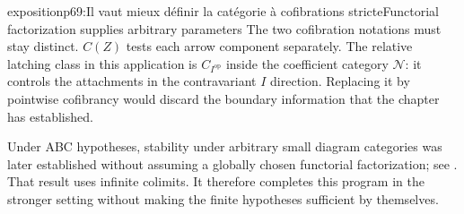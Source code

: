 \begin{dcomment}{exposition}{p69:Il vaut mieux définir la catégorie à cofibrations stricte}{Functorial factorization supplies arbitrary parameters}
The two cofibration notations must stay distinct. $C(Z)$ tests each arrow component separately. The relative latching class in this application is $C_{I^{\mathrm{op}}}$ inside the coefficient category $\mathcal N$: it controls the attachments in the contravariant $I$ direction. Replacing it by pointwise cofibrancy would discard the boundary information that the chapter has established.

Under ABC hypotheses, stability under arbitrary small diagram categories was later established without assuming a globally chosen functorial factorization; see \citet[Theorem 1.24]{Lenz2018}. That result uses infinite colimits. It therefore completes this program in the stronger setting without making the finite hypotheses sufficient by themselves.
\end{dcomment}

